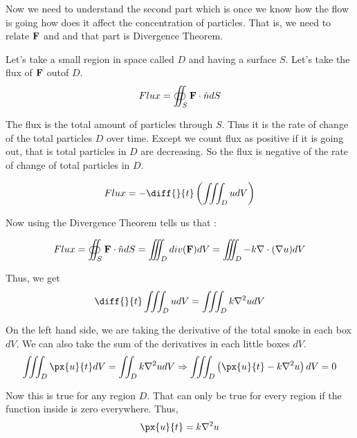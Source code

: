 Now we need to understand the second part which is once we know how the flow is going how does it affect the concentration of particles. 
That is, we need to relate ${\bf F}$ and  and that part is Divergence Theorem.

Let's take a small region in space called $D$ and having a surface $S$.
Let's take the flux of ${\bf F}$ outof $D$.
$$
Flux = \oiint_S {\bf F} \cdot \hat{n} dS
$$

The flux is the total amount of particles through $S$.
Thus it is the rate of change of the total particles $D$ over time.
Except we count flux as positive if it is going out, that is total particles in $D$ are decreasing.
So the flux is negative of the rate of change of total particles in $D$.

$$
Flux = - \diff{}{t} \left( \iiint_D u dV \right)
$$

Now using the Divergence Theorem tells us that :

$$
Flux = \oiint_S {\bf F} \cdot \hat{n} dS = \iiint_D div({\bf F}) dV = \iiint_D - k \nabla \cdot (\nabla u) dV 
$$

Thus, we get
$$
    \diff{}{t} \iiint_D u dV = \iiint_D k \nabla^2 u dV
$$

On the left hand side, we are taking the derivative of the total smoke in each box $dV$. 
We can also take the sum of the derivatives in each little boxes $dV$.
$$
\iiint_D \px{u}{t} dV = \iint_D k \nabla^2 u dV
\Rightarrow
\iiint_D \left( \px{u}{t} - k \nabla^2 u \right) dV = 0
$$

Now this is true for any region $D$. That can only be true for every region if the function inside is zero everywhere.
Thus,
$$ 
\px{u}{t} = k \nabla^2 u
$$
